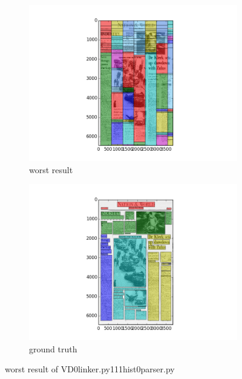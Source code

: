 \documentclass[a4paper,10pt]{article}
\begin{document}
					\begin{figure}
					\centering
					\begin{subfigure}{.5\textwidth}
					  \centering
					  \includegraphics[width=10cm]
					{VD0linker.py111hist0parser.py.worst.png}
					  \caption{worst result}
					  \label{fig:sub1}
					\end{subfigure}%
					\begin{subfigure}{.5\textwidth}
					  \centering
					  \includegraphics[width=10cm]
					{VD0linker.py111hist0parser.py.gt.worst.png}
					  \caption{ground truth}
					  \label{fig:sub2}
					\end{subfigure}
					\caption
					{worst result of VD0linker.py111hist0parser.py}
					\label{fig:test}
					\end{figure}
					
\end{document}
